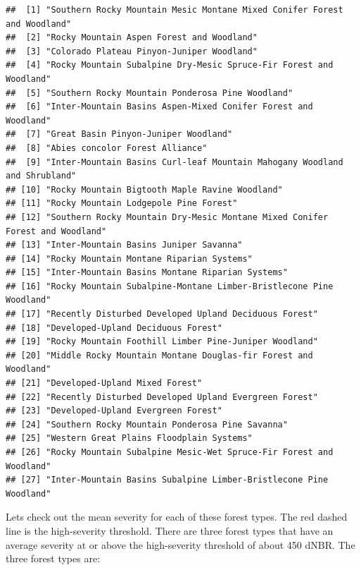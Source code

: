 \documentclass[]{book}
\begin{document}
\begin{verbatim}
##  [1] "Southern Rocky Mountain Mesic Montane Mixed Conifer Forest and Woodland"    
##  [2] "Rocky Mountain Aspen Forest and Woodland"                                   
##  [3] "Colorado Plateau Pinyon-Juniper Woodland"                                   
##  [4] "Rocky Mountain Subalpine Dry-Mesic Spruce-Fir Forest and Woodland"          
##  [5] "Southern Rocky Mountain Ponderosa Pine Woodland"                            
##  [6] "Inter-Mountain Basins Aspen-Mixed Conifer Forest and Woodland"              
##  [7] "Great Basin Pinyon-Juniper Woodland"                                        
##  [8] "Abies concolor Forest Alliance"                                             
##  [9] "Inter-Mountain Basins Curl-leaf Mountain Mahogany Woodland and Shrubland"   
## [10] "Rocky Mountain Bigtooth Maple Ravine Woodland"                              
## [11] "Rocky Mountain Lodgepole Pine Forest"                                       
## [12] "Southern Rocky Mountain Dry-Mesic Montane Mixed Conifer Forest and Woodland"
## [13] "Inter-Mountain Basins Juniper Savanna"                                      
## [14] "Rocky Mountain Montane Riparian Systems"                                    
## [15] "Inter-Mountain Basins Montane Riparian Systems"                             
## [16] "Rocky Mountain Subalpine-Montane Limber-Bristlecone Pine Woodland"          
## [17] "Recently Disturbed Developed Upland Deciduous Forest"                       
## [18] "Developed-Upland Deciduous Forest"                                          
## [19] "Rocky Mountain Foothill Limber Pine-Juniper Woodland"                       
## [20] "Middle Rocky Mountain Montane Douglas-fir Forest and Woodland"              
## [21] "Developed-Upland Mixed Forest"                                              
## [22] "Recently Disturbed Developed Upland Evergreen Forest"                       
## [23] "Developed-Upland Evergreen Forest"                                          
## [24] "Southern Rocky Mountain Ponderosa Pine Savanna"                             
## [25] "Western Great Plains Floodplain Systems"                                    
## [26] "Rocky Mountain Subalpine Mesic-Wet Spruce-Fir Forest and Woodland"          
## [27] "Inter-Mountain Basins Subalpine Limber-Bristlecone Pine Woodland"
\end{verbatim}

Lets check out the mean severity for each of these forest types.
The red dashed line is the high-severity threshold.
There are three forest types that have an average severity at or above the high-severity threshold of about 450 dNBR.
The three forest types are:
\end{document}
